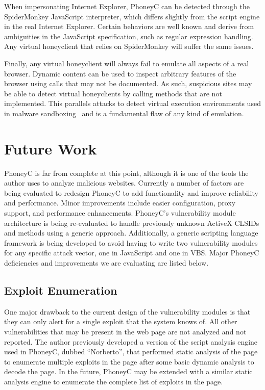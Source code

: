 \documentclass[10pt,twocolumn]{article}
\begin{document}
When impersonating Internet Explorer, PhoneyC can be detected through the SpiderMonkey JavaScript interpreter, which differs slightly from the script engine in the real Internet Explorer. Certain behaviors are well known and derive from ambiguities in the JavaScript specification, such as regular expression handling. Any virtual honeyclient that relies on SpiderMonkey will suffer the same issues. 

Finally, any virtual honeyclient will always fail to emulate all aspects of a real browser. Dynamic content can be used to inspect arbitrary features of the browser using calls that may not be documented. As such, suspicious sites may be able to detect virtual honeyclients by calling methods that are not implemented. This parallels attacks to detect virtual execution environments used in malware sandboxing~\cite{natvig:2008} and is a fundamental flaw of any kind of emulation.

\section{Future Work}
\label{future-work}

PhoneyC is far from complete at this point, although it is one of the tools the author uses to analyze malicious websites. Currently a number of factors are being evaluated to redesign PhoneyC to add functionality and improve reliability and performance. Minor improvements include easier configuration, proxy support, and performance enhancements. PhoneyC's vulnerability module architecture is being re-evaluated to handle previously unknown ActiveX CLSIDs and methods using a generic approach. Additionally, a generic scripting language framework is being developed to avoid having to write two vulnerability modules for any specific attack vector, one in JavaScript and one in VBS. Major PhoneyC deficiencies and improvements we are evaluating are listed below.

\subsection{Exploit Enumeration}
\label{exploit-enumeration}

One major drawback to the current design of the vulnerability modules is that they can only alert for a single exploit that the system knows of. All other vulnerabilities that may be present in the web page are not analyzed and not reported. The author previously developed a version of the script analysis engine used in PhoneyC, dubbed ``Norberto'', that performed static analysis of the page to enumerate multiple exploits in the page after some basic dynamic analysis to decode the page. In the future, PhoneyC may be extended with a similar static analysis engine to enumerate the complete list of exploits in the page.
\end{document}
